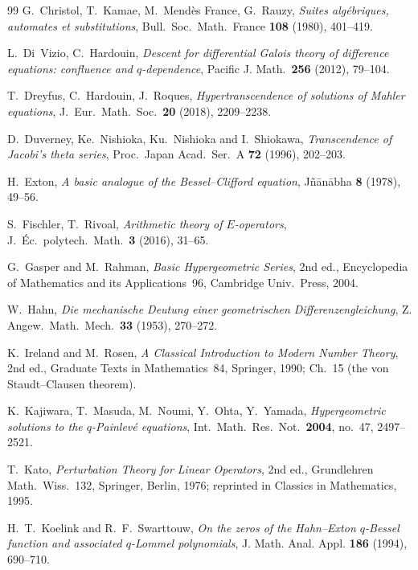 \documentclass[11pt]{article}
\theoremstyle{plain}
\theoremstyle{definition}
\theoremstyle{remark}
\begin{document}
\begin{thebibliography}{99}
 G.~Christol, T.~Kamae, M.~Mend\`es France, G.~Rauzy, \emph{Suites alg\'ebriques,
automates et substitutions}, Bull.\ Soc.\ Math.\ France \textbf{108} (1980), 401--419.

 L.~Di~Vizio, C.~Hardouin, \emph{Descent for differential Galois theory
of difference equations: confluence and $q$-dependence}, Pacific J. Math.\ \textbf{256} (2012),
79--104.

 T.~Dreyfus, C.~Hardouin, J.~Roques, \emph{Hypertranscendence of solutions of
Mahler equations}, J.~Eur.\ Math.\ Soc.\ \textbf{20} (2018), 2209--2238.

 D.~Duverney, Ke.~Nishioka, Ku.~Nishioka and I.~Shiokawa, \emph{Transcendence
of Jacobi's theta series}, Proc.\ Japan Acad.\ Ser.~A \textbf{72} (1996), 202--203.

 H.~Exton, \emph{A basic analogue of the Bessel--Clifford equation},
J\~n\=an\=abha \textbf{8} (1978), 49--56.

 S.~Fischler, T.~Rivoal, \emph{Arithmetic theory of $E$-operators},
J.~\'Ec.\ polytech.\ Math.\ \textbf{3} (2016), 31--65.

 G.~Gasper and M.~Rahman, \emph{Basic Hypergeometric Series}, 2nd ed.,
Encyclopedia of Mathematics and its Applications~96, Cambridge Univ.\ Press, 2004.

 W.~Hahn, \emph{Die mechanische Deutung einer geometrischen
Differenzengleichung}, Z. Angew.\ Math.\ Mech.\ \textbf{33} (1953), 270--272.

 K.~Ireland and M.~Rosen, \emph{A Classical Introduction to Modern Number
Theory}, 2nd ed., Graduate Texts in Mathematics~84, Springer, 1990; Ch.~15 (the von
Staudt--Clausen theorem).

 K.~Kajiwara, T.~Masuda, M.~Noumi, Y.~Ohta, Y.~Yamada, \emph{Hypergeometric
solutions to the $q$-Painlev\'e equations}, Int.\ Math.\ Res.\ Not.\ \textbf{2004}, no.~47,
2497--2521.

 T.~Kato, \emph{Perturbation Theory for Linear Operators}, 2nd ed., Grundlehren
Math.\ Wiss.~132, Springer, Berlin, 1976; reprinted in Classics in Mathematics, 1995.

 H.~T.~Koelink and R.~F.~Swarttouw, \emph{On the zeros of the
Hahn--Exton $q$-Bessel function and associated $q$-Lommel polynomials}, J. Math. Anal. Appl.
\textbf{186} (1994), 690--710.


\end{thebibliography}
\end{document}
